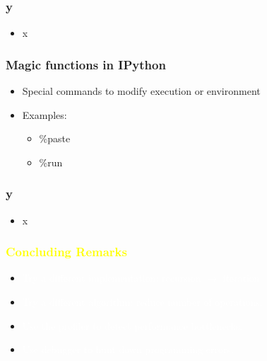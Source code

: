 \documentclass[xcolor=table,10pt,final]{beamer}
\begin{document}
\begin{frame}
	\frametitle{y}
	\begin{itemize}
		\item x
	\end{itemize}
\end{frame}

\begin{frame}
	\frametitle{Magic functions in IPython}
	\begin{itemize}
		\item Special commands to modify execution or environment
		\item Examples:
		\begin{itemize}
			\item \%paste
			\item \%run
		\end{itemize}
	\end{itemize}
\end{frame}



\begin{frame}
	\frametitle{y}
	\begin{itemize}
		\item x
	\end{itemize}
\end{frame}

{
\begin{frame}
	\frametitle{\textcolor{yellow}{Concluding Remarks}}
	\begin{itemize}
		\item \textcolor{white}{Try a different implementation: recursion $\rightarrow$ iteration.}
		\item \textcolor{white}{Try a different algorithm: reduce number of operations.}
		\item \textcolor{white}{Use the profiler to detect performance bottlenecks.}
		\item \textcolor{white}{Use debugger to hunt down programming errors.}
	\end{itemize}
\end{frame}
}

\end{document}
